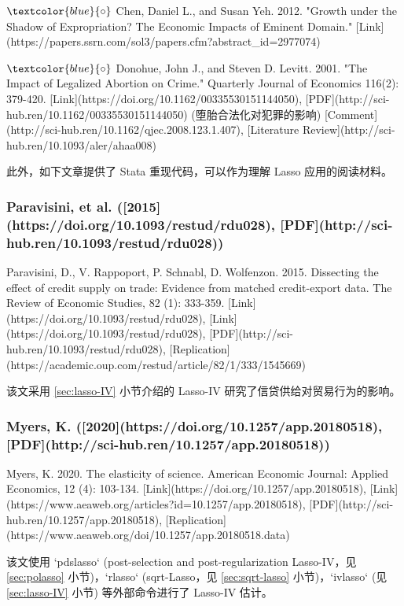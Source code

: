 {$\textcolor{blue}{\circ}$ 
Chen, Daniel L., and Susan Yeh. 2012. "Growth under the Shadow of Expropriation? The Economic Impacts of Eminent Domain." [Link](https://papers.ssrn.com/sol3/papers.cfm?abstract_id=2977074)

$\textcolor{blue}{\circ}$ 
Donohue, John J., and Steven D. Levitt. 2001. "The Impact of Legalized Abortion on Crime." Quarterly Journal of Economics 116(2): 379-420. [Link](https://doi.org/10.1162/00335530151144050), [PDF](http://sci-hub.ren/10.1162/00335530151144050) (堕胎合法化对犯罪的影响)
[Comment](http://sci-hub.ren/10.1162/qjec.2008.123.1.407), [Literature Review](http://sci-hub.ren/10.1093/aler/ahaa008)

\vspace{6pt}

此外，如下文章提供了 Stata 重现代码，可以作为理解 Lasso 应用的阅读材料。

\subsubsection{Paravisini, et al. ([2015](https://doi.org/10.1093/restud/rdu028), [PDF](http://sci-hub.ren/10.1093/restud/rdu028))}

Paravisini, D., V. Rappoport, P. Schnabl, D. Wolfenzon. 2015. Dissecting the effect of credit supply on trade: Evidence from matched credit-export data. The Review of Economic Studies, 82 (1): 333-359. [Link](https://doi.org/10.1093/restud/rdu028), [Link](https://doi.org/10.1093/restud/rdu028), [PDF](http://sci-hub.ren/10.1093/restud/rdu028), [Replication](https://academic.oup.com/restud/article/82/1/333/1545669)

该文采用 \ref{sec:lasso-IV} 小节介绍的 Lasso-IV 研究了信贷供给对贸易行为的影响。  

\subsubsection{Myers, K. ([2020](https://doi.org/10.1257/app.20180518), [PDF](http://sci-hub.ren/10.1257/app.20180518))}

Myers, K. 2020. The elasticity of science. American Economic Journal: Applied Economics, 12 (4): 103-134. [Link](https://doi.org/10.1257/app.20180518), [Link](https://www.aeaweb.org/articles?id=10.1257/app.20180518), [PDF](http://sci-hub.ren/10.1257/app.20180518), [Replication](https://www.aeaweb.org/doi/10.1257/app.20180518.data)

该文使用 `pdslasso` (post-selection and post-regularization Lasso-IV，见 \ref{sec:polasso} 小节)，`rlasso` (sqrt-Lasso，见 \ref{sec:sqrt-lasso} 小节)，`ivlasso` (见 \ref{sec:lasso-IV} 小节) 等外部命令进行了 Lasso-IV 估计。
  


}
